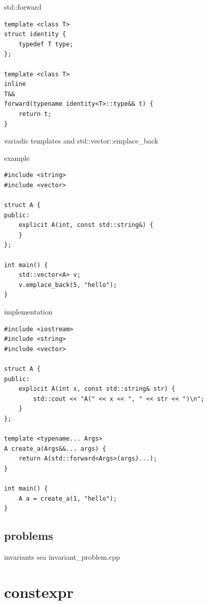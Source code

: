 \documentclass{beamer}
\begin{document}
\begin{frame}{std::forward}
\begin{verbatim}
template <class T>
struct identity {
    typedef T type;
};

template <class T>
inline
T&&
forward(typename identity<T>::type&& t) {
    return t;
}
\end{verbatim}
\end{frame}

\begin{frame}{variadic templates and std::vector::emplace\_back}
  \begin{block}{example}
\begin{verbatim}
#include <string>
#include <vector>

struct A {
public:
    explicit A(int, const std::string&) {
    }
};

int main() {
    std::vector<A> v;
    v.emplace_back(5, "hello");
}
\end{verbatim}
  \end{block}
\end{frame}

\begin{frame}
  \begin{block}{implementation}
\begin{verbatim}
#include <iostream>
#include <string>
#include <vector>

struct A {
public:
    explicit A(int x, const std::string& str) {
        std::cout << "A(" << x << ", " << str << ")\n";
    }
};

template <typename... Args>
A create_a(Args&&... args) {
    return A(std::forward<Args>(args)...);
}

int main() {
    A a = create_a(1, "hello");
}
\end{verbatim}
  \end{block}
\end{frame}

\subsection{problems}
\begin{frame}{invariants}
  sea invariant\_problem.cpp
\end{frame}

\section{constexpr}
\end{document}
